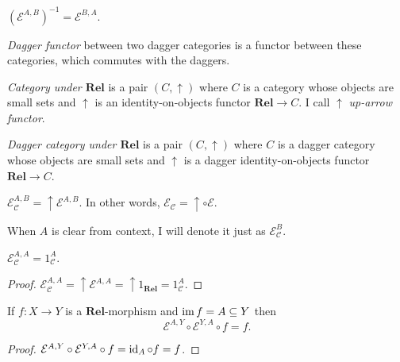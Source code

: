 \begin{obvious}
$(\mathcal{E}^{A,B})^{- 1} = \mathcal{E}^{B,A}$.
\end{obvious}

\begin{defn}
\emph{Dagger functor} between two dagger categories is a functor between
these categories, which commutes with the daggers.
\end{defn}

\begin{defn}
\emph{Category under $\mathbf{Rel}$} is a pair $(C , \uparrow)$
where $C$ is a category whose objects are small sets and $\uparrow$ is an
identity-on-objects functor $\mathbf{Rel} \rightarrow C$. I call
$\uparrow$ \emph{up-arrow functor}.
\end{defn}

\begin{defn}
  \emph{Dagger category under $\mathbf{Rel}$} is a pair $(C ,
  \uparrow)$ where $C$ is a dagger category whose objects are small sets and
  $\uparrow$ is a dagger identity-on-objects functor $\mathbf{Rel}
  \rightarrow C$.
\end{defn}

\begin{defn}
  $\mathcal{E}_{\mathcal{C}}^{A,B} = \uparrow \mathcal{E}^{A,B}$. In
  other words, $\mathcal{E}_{\mathcal{C}} = \uparrow \circ \mathcal{E}$.
  
  When $A$ is clear from context, I will denote it just as $\mathcal{E}_{\mathcal{C}}^B$.
\end{defn}

\begin{prop}
  $\mathcal{E}_{\mathcal{C}}^{A,A} = 1_{\mathcal{C}}^A$.
\end{prop}

\begin{proof}
  $\mathcal{E}_{\mathcal{C}}^{A,A} = \uparrow \mathcal{E}^{A,A} =
  \uparrow 1_{\mathbf{Rel}} = 1_{\mathcal{C}}^A$.
\end{proof}

\begin{prop}
  If $f : X \rightarrow Y$ is a $\mathbf{Rel}$-morphism and
  $\operatorname{im} f = A \subseteq Y$ then
  \[ \mathcal{E}^{A,Y} \circ \mathcal{E}^{Y,A} \circ f = f. \]
\end{prop}

\begin{proof}
  $\mathcal{E}^{A,Y} \circ \mathcal{E}^{Y,A} \circ f = \operatorname{id}_A
  \circ f = f$.
\end{proof}

